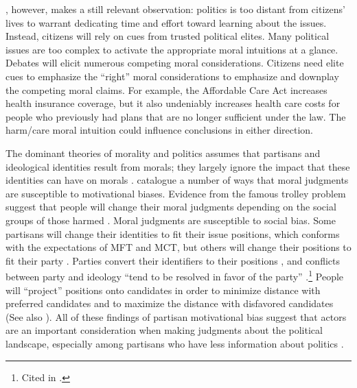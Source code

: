 , however, makes a still relevant observation: politics is too distant from citizens' lives to warrant dedicating time and effort toward learning about the issues. Instead, citizens will rely on cues from trusted political elites. Many political issues are too complex to activate the appropriate moral intuitions at a glance. Debates will elicit numerous competing moral considerations. Citizens need elite cues to emphasize the ``right'' moral considerations to emphasize and downplay the competing moral claims. For example, the Affordable Care Act increases health insurance coverage, but it also undeniably increases health care costs for people who previously had plans that are no longer sufficient under the law. The harm/care moral intuition could influence conclusions in either direction.

The dominant theories of morality and politics assumes that partisans and ideological identities result from morals; they largely ignore the impact that these identities can have on morals \cite{Bartels2002b,Goren2005,LaymanCarsey2002b}.  catalogue a number of ways that moral judgments are susceptible to motivational biases. Evidence from the famous trolley problem suggest that people will change their moral judgments depending on the social groups of those harmed \cite{Uhlmannetal2009}. Moral judgments are susceptible to social bias. Some partisans will change their identities to fit their issue positions, which conforms with the expectations of MFT and MCT, but others will change their positions to fit their party \cite{LaymanCarsey2002b}. Parties convert their identifiers to their positions \cite{Levendusky2009b}, and conflicts between party and ideology ``tend to be resolved in favor of the party'' \cite{Johnstonetal2004}.\footnote{Cited in .} People will ``project'' positions onto candidates in order to minimize distance with preferred candidates and to maximize the distance with disfavored candidates \cite{MarkusConverse1979} (See also \cite{Grahametal2012}). All of these findings of partisan motivational bias suggest that actors are an important consideration when making judgments about the political landscape, especially among partisans who have less information about politics \cite{BradySniderman1985}.

